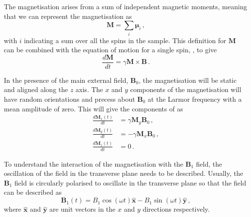 The magnetisation arises from a sum of independent magnetic moments, meaning that we can represent the magnetisation as 
\begin{equation}
	\mathbf{M} = \sum_i \boldsymbol{\mu}_i \,,
        \label{eq:net_magnetisation}
\end{equation}
with $i$ indicating a sum over all the spins in the sample.
This definition for $\mathbf{M}$ can be combined with the equation of motion for a single spin, , to give \cite{Haacke1999}
\begin{equation}
	\frac{d\mathbf{M}}{dt} = \gamma \mathbf{M} \times \mathbf{B}\,.
	\label{eq:dMdt}
\end{equation}  

In the presence of the main external field, $\mathbf{B}_0$, the magnetisation will be static and aligned along the $z$ axis. The $x$ and $y$ components of the magnetisation will have random orientations and precess about $\mathbf{B}_0$ at the Larmor frequency with a mean amplitude of zero. This will give the components of  as\cite{DeGraaf2007}
\begin{align}
	\frac{d\mathbf{M}_x(t)}{dt} &= \gamma\mathbf{M}_y\mathbf{B}_0\,,\\
	\frac{d\mathbf{M}_y(t)}{dt} &= -\gamma\mathbf{M}_x\mathbf{B}_0\,,\\	\frac{d\mathbf{M}_z(t)}{dt} &= 0 \,.
\end{align}

To understand the interaction of the magnetisation with the $\mathbf{B}_1$ field, the oscillation of the field in the transverse plane needs to be described. 
%
Usually, the $\mathbf{B}_1$ field is circularly polarised to oscillate in the transverse plane so that the field can be described as
\begin{equation}
	\mathbf{B}_1(t) = B_1\cos(\omega t) \mathbf{\hat{x}} - B_1\sin(\omega t) \mathbf{\hat{y}}\,,
	\label{eq:circB1}
\end{equation}
where $\mathbf{\hat{x}}$ and $\mathbf{\hat{y}}$ are unit vectors in the $x$ and $y$ directions respectively. 


